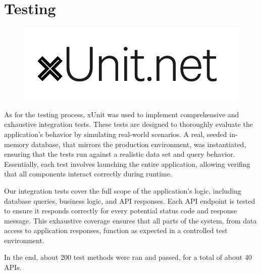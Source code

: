 \chapter{Testing}

\begin{figure}[H]
    \hfill
    \includegraphics[width=0.2\linewidth]{../assets/tools-logos/xunit.png}
    \hspace{1cm}
\end{figure}

As for the testing process, xUnit was used to implement comprehensive and exhaustive integration tests.
These tests are designed to thoroughly evaluate the application’s behavior by simulating real-world scenarios.
A real, seeded in-memory database, that mirrors the production environment, was instantiated, ensuring that the tests run against a realistic data set and query behavior.
Essentially, each test involves launching the entire application, allowing verifing that all components interact correctly during runtime.

Our integration tests cover the full scope of the application’s logic, including database queries, business logic, and API responses.
Each API endpoint is tested to ensure it responds correctly for every potential status code and response message.
This exhaustive coverage ensures that all parts of the system, from data access to application responses, function as expected in a controlled test environment.

In the end, about 200 test methods were ran and passed, for a total of about 40 APIs.

